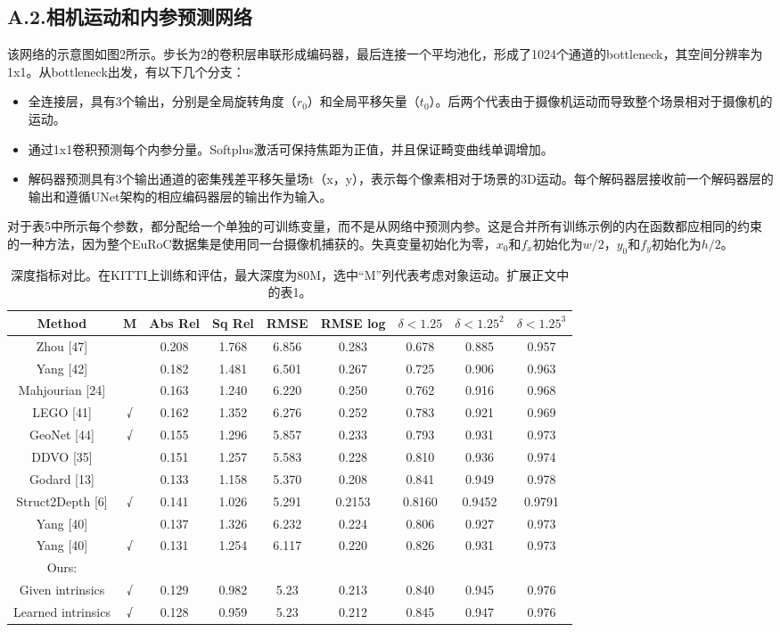 \documentclass[10pt,journal,compsoc,UTF8]{IEEEtran}
\begin{document}
\subsection*{A.2.相机运动和内参预测网络}
该网络的示意图如图2所示。步长为2的卷积层串联形成编码器，最后连接一个平均池化，形成了1024个通道的bottleneck，其空间分辨率为1x1。从bottleneck出发，有以下几个分支：
\begin{itemize}
  \item 全连接层，具有3个输出，分别是全局旋转角度（$r_0$）和全局平移矢量（$t_0$）。后两个代表由于摄像机运动而导致整个场景相对于摄像机的运动。
  \item 通过1x1卷积预测每个内参分量。Softplus激活可保持焦距为正值，并且保证畸变曲线单调增加。
  \item 解码器预测具有3个输出通道的密集残差平移矢量场t（x，y），表示每个像素相对于场景的3D运动。每个解码器层接收前一个解码器层的输出和遵循UNet架构的相应编码器层的输出作为输入。
\end{itemize}

对于表5中所示每个参数，都分配给一个单独的可训练变量，而不是从网络中预测内参。这是合并所有训练示例的内在函数都应相同的约束的一种方法，因为整个EuRoC数据集是使用同一台摄像机捕获的。失真变量初始化为零，$x_0$和$f_x$初始化为$w/2$，$y_0$和$f_y$初始化为$h/2$。
\cleardoublepage
\begin{table}
  \centering
  \begin{tabular}{|c|c|c|c|c|c|c|c|c|}
  \hline
  Method&M&Abs Rel&Sq Rel&RMSE&RMSE log&$\delta<1.25$&$\delta<1.25^2$&$\delta<1.25^3$\\
  \hline
  Zhou [47]        & & 0.208& 1.768& 6.856& 0.283& 0.678& 0.885& 0.957\\
  Yang [42]        & & 0.182& 1.481& 6.501& 0.267& 0.725& 0.906& 0.963\\
  Mahjourian [24]  & & 0.163& 1.240& 6.220& 0.250& 0.762& 0.916& 0.968\\
  LEGO [41]        &√& 0.162& 1.352& 6.276& 0.252& 0.783& 0.921& 0.969\\
  GeoNet [44]      &√& 0.155& 1.296& 5.857& 0.233& 0.793& 0.931& 0.973\\
  DDVO [35]        & & 0.151& 1.257& 5.583& 0.228& 0.810& 0.936& 0.974\\
  Godard [13]      & & 0.133& 1.158& 5.370& 0.208& 0.841& 0.949& 0.978\\
  Struct2Depth [6] &√& 0.141& 1.026& 5.291&0.2153&0.8160&0.9452&0.9791\\
  Yang [40]        & & 0.137& 1.326& 6.232& 0.224& 0.806& 0.927& 0.973\\
  Yang [40]        &√& 0.131& 1.254& 6.117& 0.220& 0.826& 0.931& 0.973\\
  \hline
  Ours:              & &  &  &  &  &  &  &  \\
  Given intrinsics   &√& 0.129& 0.982& 5.23& 0.213& 0.840& 0.945& 0.976\\
  Learned intrinsics &√& 0.128& 0.959& 5.23& 0.212& 0.845& 0.947& 0.976\\
  \hline
\end{tabular}
\caption{深度指标对比。在KITTI上训练和评估，最大深度为80M，选中“M”列代表考虑对象运动。扩展正文中的表1。}

\end{table}
\end{document}
